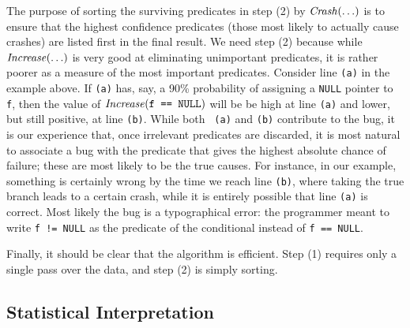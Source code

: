 The purpose of sorting the surviving predicates in step (2) by
$\mbox{\textit{Crash}}(\ldots)$ is to ensure that the highest confidence predicates (those
most likely to actually cause crashes) are listed first in the final
result.  We need step (2) because while $\mbox{\textit{Increase}}(\ldots)$ is very good at
eliminating unimportant predicates, it is rather poorer as a measure
of the most important predicates.  Consider line {\tt (a)} in the
example above.  If {\tt (a)} has, say, a 90\% probability of assigning
a {\tt NULL} pointer to {\tt f}, then the value of
$\mbox{\textit{Increase}}(\mbox{\tt f == NULL})$ will be be high at line {\tt (a)}
and lower, but still positive, at line {\tt (b)}.  While both {\tt
(a)} and {\tt (b)} contribute to the bug, it is our experience that,
once irrelevant predicates are discarded, it is most natural to
associate a bug with the predicate that gives the highest absolute
chance of failure; these are most likely to be the true causes.  For
instance, in our example, something is certainly wrong by the time we
reach line {\tt (b)}, where taking the true branch leads to a certain
crash, while it is entirely possible that line {\tt (a)} is correct.
Most likely the bug is a typographical error: the programmer meant to
write {\tt f != NULL} as the predicate of the conditional instead of
{\tt f == NULL}.

Finally, it should be clear that the algorithm is efficient.
Step (1) requires only a single pass over the data, and step (2) is
simply sorting.

\subsection{Statistical Interpretation}

